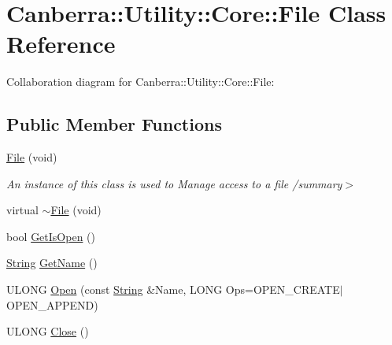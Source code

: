 \hypertarget{class_canberra_1_1_utility_1_1_core_1_1_file}{}\section{Canberra\+:\+:Utility\+:\+:Core\+:\+:File Class Reference}
\label{class_canberra_1_1_utility_1_1_core_1_1_file}


Collaboration diagram for Canberra\+:\+:Utility\+:\+:Core\+:\+:File\+:
\subsection*{Public Member Functions}
\begin{DoxyCompactItemize}
\item 
\mbox{\label{class_canberra_1_1_utility_1_1_core_1_1_file_af6f8632ae216aff08d617f188ede78b0}} 
\hyperlink{class_canberra_1_1_utility_1_1_core_1_1_file_af6f8632ae216aff08d617f188ede78b0}{File} (void)
\begin{DoxyCompactList}\small\item\em An instance of this class is used to Manage access to a file /summary$>$ \end{DoxyCompactList}\item 
virtual \hyperlink{class_canberra_1_1_utility_1_1_core_1_1_file_ab66aba37064f0601fe750fd4b395085c_ab66aba37064f0601fe750fd4b395085c}{$\sim$\+File} (void)
\item 
bool \hyperlink{class_canberra_1_1_utility_1_1_core_1_1_file_abf3cd9f9ffc13bafcc3b199c15af4f02_abf3cd9f9ffc13bafcc3b199c15af4f02}{Get\+Is\+Open} ()
\item 
\hyperlink{class_canberra_1_1_utility_1_1_core_1_1_string}{String} \hyperlink{class_canberra_1_1_utility_1_1_core_1_1_file_a13f16e16abcd43806ffcae5739e57486_a13f16e16abcd43806ffcae5739e57486}{Get\+Name} ()
\item 
U\+L\+O\+NG \hyperlink{class_canberra_1_1_utility_1_1_core_1_1_file_ae45067e4e57963ebaca8bf462c9fe979_ae45067e4e57963ebaca8bf462c9fe979}{Open} (const \hyperlink{class_canberra_1_1_utility_1_1_core_1_1_string}{String} \&Name, L\+O\+NG Ops=O\+P\+E\+N\+\_\+\+C\+R\+E\+A\+TE$\vert$O\+P\+E\+N\+\_\+\+A\+P\+P\+E\+ND)
\item 
U\+L\+O\+NG \hyperlink{class_canberra_1_1_utility_1_1_core_1_1_file_aa421329224af00499fe56cd5cfacd70a_aa421329224af00499fe56cd5cfacd70a}{Close} ()

\end{DoxyCompactItemize}
